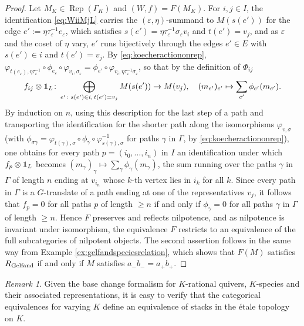 \documentclass[a4paper,12pt,reqno]{amsart}
\DeclareMathOperator{\Rep}{\mathrm{Rep}}
\theoremstyle{plain}
\theoremstyle{remark}
\newtheorem{remark}[theorem]{Remark}
\begin{document}
  \begin{proof}
    Let $M_K\in\Rep(\Gamma_K)$ and $(W,f)=F(M_K)$. For $i,j\in I$, the identification \eqref{eq:WiiMjL} carries the $(\varepsilon,\eta)$-summand to $M(s(e'))$ for the edge $e':=\eta\tau_\varepsilon^{-1}e_\varepsilon$, which satisfies $s(e')=\eta\tau_\varepsilon^{-1}\sigma_\varepsilon v_i$ and $t(e')=v_j$, and as $\varepsilon$ and the coset of $\eta$ vary, $e'$ runs bijectively through the edges $e'\in E$ with $s(e')\in i$ and $t(e')=v_j$. By \eqref{eq:koecheractiononrep}, $\varphi_{t(e_\varepsilon),\eta\tau_\varepsilon^{-1}}\circ\phi_{e_\varepsilon}\circ\varphi_{v_i,\sigma_\varepsilon}=\phi_{e'}\circ\varphi_{v_i,\eta\tau_\varepsilon^{-1}\sigma_\varepsilon}$, so that by the definition of $\Phi_{ij}$
    \[
    f_{ij}\otimes{\bf1}_L\colon\bigoplus_{e'\colon s(e')\in i,\,t(e')=v_j}M(s(e'))\to M(v_j),\quad(m_{e'})_{e'}\mapsto\sum_{e'}\phi_{e'}(m_{e'}).
    \]
    By induction on $n$, using this description for the last step of a path and transporting the identification for the shorter path along the isomorphisms $\varphi_{v,\sigma}$ (with $\phi_{\sigma\gamma}=\varphi_{t(\gamma),\sigma}\circ\phi_\gamma\circ\varphi_{s(\gamma),\sigma}^{-1}$ for paths $\gamma$ in $\Gamma$, by \eqref{eq:koecheractiononrep}), one obtains for every path $p=(i_0,\dots,i_n)$ in $I$ an identification under which $f_p\otimes{\bf1}_L$ becomes $(m_\gamma)_\gamma\mapsto\sum_\gamma\phi_\gamma(m_\gamma)$, the sum running over the paths $\gamma$ in $\Gamma$ of length $n$ ending at $v_{i_n}$ whose $k$-th vertex lies in $i_k$ for all $k$. Since every path in $\Gamma$ is a $G$-translate of a path ending at one of the representatives $v_j$, it follows that $f_p=0$ for all paths $p$ of length $\geq n$ if and only if $\phi_\gamma=0$ for all paths $\gamma$ in $\Gamma$ of length $\geq n$. Hence $F$ preserves and reflects nilpotence, and as nilpotence is invariant under isomorphism, the equivalence $F$ restricts to an equivalence of the full subcategories of nilpotent objects. The second assertion follows in the same way from Example \ref{ex:gelfandspeciesrelation}, which shows that $F(M)$ satisfies $R_{\rm Gelfand}$ if and only if $M$ satisfies $a_-b_-=a_+b_+$.
  \end{proof}

  \begin{remark}\label{rmk:speciesstack}
    Given the base change formalism for $K$-rational quivers, $K$-species and their associated representations, it is easy to verify that the categorical equivalences for varying $K$ define an equivalence of stacks in the \'etale topology on $K$.
  \end{remark}
\end{document}
